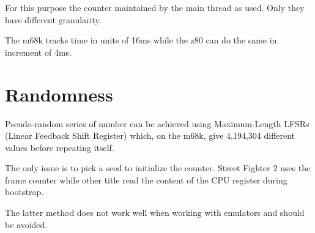 For this purpose the counter maintained by the main thread as used. Only they have different granularity.

The m68k tracks time in units of 16ms while the z80 can do the same in increment of 4ms.


\section{Randomness}
Pseudo-random series of number can be achieved using Maximum-Length LFSRs (Linear Feedback Shift Register) which, on the m68k, give 4,194,304 different values before repeating itself.

The only issue is to pick a seed to initialize the counter. Street Fighter 2 uses the frame counter while other title read the content of the CPU register during bootstrap.

The latter method does not work well when working with emulators and should be avoided.
